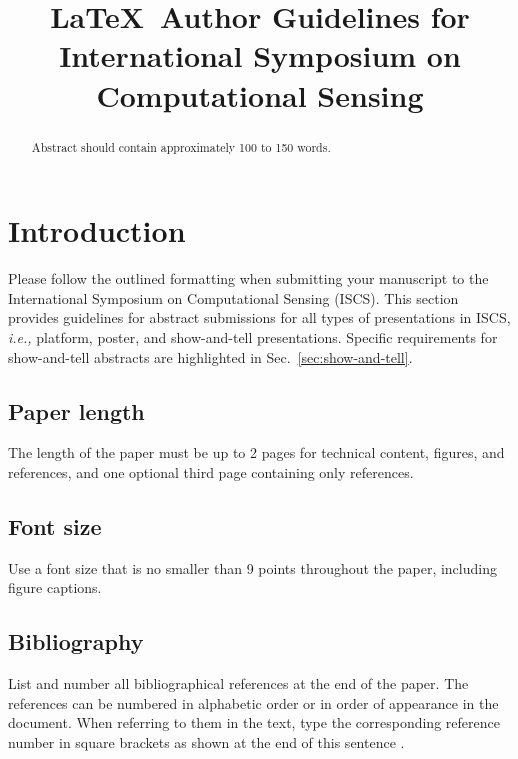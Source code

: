\documentclass[9pt,conference]{IEEEtran}
\begin{document}
\title{\LaTeX~Author Guidelines for \\International Symposium on Computational Sensing}
\author{
}
\maketitle
\begin{abstract}
    Abstract should contain approximately 100 to 150 words.
\end{abstract}

\section{Introduction}
Please follow the outlined formatting when submitting
your manuscript to the International Symposium on Computational Sensing (ISCS). This section provides guidelines for abstract submissions for all types of presentations in ISCS, \textit{i.e.,} platform, poster, and show-and-tell presentations. Specific requirements for show-and-tell abstracts are highlighted in Sec.~\ref{sec:show-and-tell}.
\subsection{Paper length}
The length of the paper must be up to 2 pages for technical content, figures, and references, and one optional third page containing only references.
\subsection{Font size}
Use a font size that is no smaller than 9 points throughout the paper, including figure captions.
\subsection{Bibliography}
List and number all bibliographical references at the end of
the paper. The references can be numbered in alphabetic order
or in order of appearance in the document.
When referring to
them in the text, type the corresponding reference number in
square brackets as shown at the end of this sentence \cite{code1}.
\end{document}
